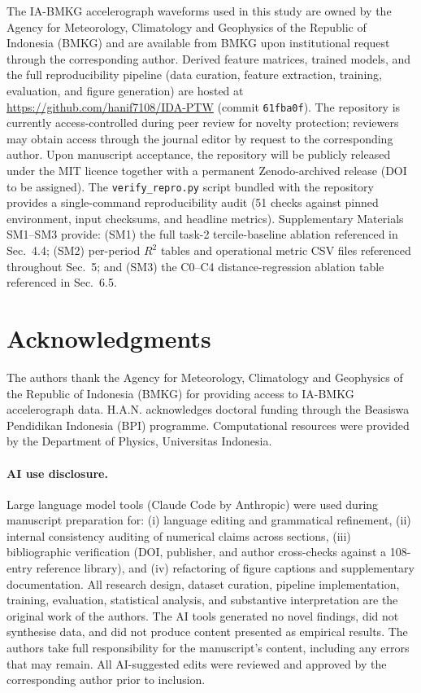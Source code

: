 \documentclass[10pt]{article}
\begin{document}
The IA-BMKG accelerograph waveforms used in this study are owned by the Agency
for Meteorology, Climatology and Geophysics of the Republic of Indonesia (BMKG)
and are available from BMKG upon institutional request through the corresponding
author. Derived feature matrices, trained models, and the full reproducibility
pipeline (data curation, feature extraction, training, evaluation, and figure
generation) are hosted at \url{https://github.com/hanif7108/IDA-PTW}
(commit \texttt{61fba0f}). The repository is currently access-controlled during
peer review for novelty protection; reviewers may obtain access through the
journal editor by request to the corresponding author. Upon manuscript
acceptance, the repository will be publicly released under the MIT licence
together with a permanent Zenodo-archived release (DOI to be assigned). The
\texttt{verify\_repro.py} script bundled with the repository provides a
single-command reproducibility audit (51 checks against pinned environment,
input checksums, and headline metrics). Supplementary Materials SM1--SM3 provide:
(SM1) the full task-2 tercile-baseline ablation referenced in Sec.~4.4; (SM2)
per-period $R^2$ tables and operational metric CSV files referenced throughout
Sec.~5; and (SM3) the C0--C4 distance-regression ablation table referenced in
Sec.~6.5.

\section*{Acknowledgments}

The authors thank the Agency for Meteorology, Climatology and Geophysics of
the Republic of Indonesia (BMKG) for providing access to IA-BMKG accelerograph
data. H.A.N. acknowledges doctoral funding through the Beasiswa Pendidikan
Indonesia (BPI) programme. Computational resources were provided by the
Department of Physics, Universitas Indonesia.

\paragraph{AI use disclosure.}
Large language model tools (Claude Code by Anthropic) were used during
manuscript preparation for: (i) language editing and grammatical refinement,
(ii) internal consistency auditing of numerical claims across sections,
(iii) bibliographic verification (DOI, publisher, and author cross-checks
against a 108-entry reference library), and (iv) refactoring of figure
captions and supplementary documentation. All research design, dataset
curation, pipeline implementation, training, evaluation, statistical
analysis, and substantive interpretation are the original work of the
authors. The AI tools generated no novel findings, did not synthesise data,
and did not produce content presented as empirical results. The authors take
full responsibility for the manuscript's content, including any errors that
may remain. All AI-suggested edits were reviewed and approved by the
corresponding author prior to inclusion.


\end{document}
